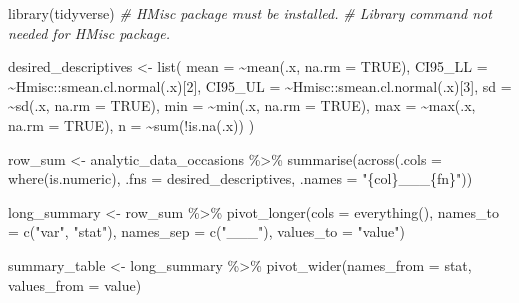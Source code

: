 \documentclass[
]{krantz}
\makeatletter
\newenvironment{Shaded}{\begin{snugshade}}{\end{snugshade}}
\newcommand{\AttributeTok}[1]{\textcolor[rgb]{0.61,0.61,0.61}{#1}}
\newcommand{\CommentTok}[1]{\textcolor[rgb]{0.37,0.37,0.37}{\textit{#1}}}
\newcommand{\ConstantTok}[1]{\textcolor[rgb]{0,0,0}{#1}}
\newcommand{\DecValTok}[1]{\textcolor[rgb]{0.06,0.06,0.06}{#1}}
\newcommand{\FunctionTok}[1]{\textcolor[rgb]{0,0,0}{#1}}
\newcommand{\NormalTok}[1]{#1}
\newcommand{\OtherTok}[1]{\textcolor[rgb]{0.37,0.37,0.37}{#1}}
\newcommand{\SpecialCharTok}[1]{\textcolor[rgb]{0,0,0}{#1}}
\newcommand{\StringTok}[1]{\textcolor[rgb]{0.5,0.5,0.5}{#1}}
\newenvironment{kframe}{%
\medskip{}
\setlength{\fboxsep}{.8em}
 \def\at@end@of@kframe{}%
 \ifinner\ifhmode%
  \def\at@end@of@kframe{\end{minipage}}%
  \begin{minipage}{\columnwidth}%
 \fi\fi%
 \def\FrameCommand##1{\hskip\@totalleftmargin \hskip-\fboxsep
 \colorbox{shadecolor}{##1}\hskip-\fboxsep
     \hskip-\linewidth \hskip-\@totalleftmargin \hskip\columnwidth}%
 \MakeFramed {\advance\hsize-\width
   \@totalleftmargin\z@ \linewidth\hsize
   \@setminipage}}%
 {\par\unskip\endMakeFramed%
 \at@end@of@kframe}
\renewenvironment{Shaded}{\begin{kframe}}{\end{kframe}}
\makeatother
\begin{document}
\begin{Shaded}
\begin{Highlighting}[]
\FunctionTok{library}\NormalTok{(tidyverse)}
\CommentTok{\# HMisc package must be installed. }
\CommentTok{\# Library command not needed for HMisc package.}

\NormalTok{desired\_descriptives }\OtherTok{\textless{}{-}} \FunctionTok{list}\NormalTok{(}
  \AttributeTok{mean =} \SpecialCharTok{\textasciitilde{}}\FunctionTok{mean}\NormalTok{(.x, }\AttributeTok{na.rm =} \ConstantTok{TRUE}\NormalTok{),}
  \AttributeTok{CI95\_LL =} \SpecialCharTok{\textasciitilde{}}\NormalTok{Hmisc}\SpecialCharTok{::}\FunctionTok{smean.cl.normal}\NormalTok{(.x)[}\DecValTok{2}\NormalTok{],}
  \AttributeTok{CI95\_UL =} \SpecialCharTok{\textasciitilde{}}\NormalTok{Hmisc}\SpecialCharTok{::}\FunctionTok{smean.cl.normal}\NormalTok{(.x)[}\DecValTok{3}\NormalTok{],}
  \AttributeTok{sd =} \SpecialCharTok{\textasciitilde{}}\FunctionTok{sd}\NormalTok{(.x, }\AttributeTok{na.rm =} \ConstantTok{TRUE}\NormalTok{),}
  \AttributeTok{min =} \SpecialCharTok{\textasciitilde{}}\FunctionTok{min}\NormalTok{(.x, }\AttributeTok{na.rm =} \ConstantTok{TRUE}\NormalTok{),}
  \AttributeTok{max =} \SpecialCharTok{\textasciitilde{}}\FunctionTok{max}\NormalTok{(.x, }\AttributeTok{na.rm =} \ConstantTok{TRUE}\NormalTok{),}
  \AttributeTok{n =} \SpecialCharTok{\textasciitilde{}}\FunctionTok{sum}\NormalTok{(}\SpecialCharTok{!}\FunctionTok{is.na}\NormalTok{(.x))}
\NormalTok{)}

\NormalTok{row\_sum }\OtherTok{\textless{}{-}}\NormalTok{ analytic\_data\_occasions }\SpecialCharTok{\%\textgreater{}\%} 
  \FunctionTok{summarise}\NormalTok{(}\FunctionTok{across}\NormalTok{(}\AttributeTok{.cols =} \FunctionTok{where}\NormalTok{(is.numeric),}
                   \AttributeTok{.fns =}\NormalTok{  desired\_descriptives,}
                   \AttributeTok{.names =} \StringTok{"\{col\}\_\_\_\{fn\}"}\NormalTok{))}

\NormalTok{long\_summary }\OtherTok{\textless{}{-}}\NormalTok{ row\_sum }\SpecialCharTok{\%\textgreater{}\%}
  \FunctionTok{pivot\_longer}\NormalTok{(}\AttributeTok{cols =} \FunctionTok{everything}\NormalTok{(),}
               \AttributeTok{names\_to =} \FunctionTok{c}\NormalTok{(}\StringTok{"var"}\NormalTok{, }\StringTok{"stat"}\NormalTok{),}
               \AttributeTok{names\_sep =} \FunctionTok{c}\NormalTok{(}\StringTok{"\_\_\_"}\NormalTok{),}
               \AttributeTok{values\_to =} \StringTok{"value"}\NormalTok{)}

\NormalTok{summary\_table }\OtherTok{\textless{}{-}}\NormalTok{ long\_summary }\SpecialCharTok{\%\textgreater{}\%} 
  \FunctionTok{pivot\_wider}\NormalTok{(}\AttributeTok{names\_from =}\NormalTok{ stat,}
              \AttributeTok{values\_from =}\NormalTok{ value)}


\end{Highlighting}
\end{Shaded}
\end{document}
